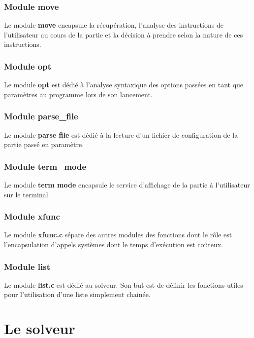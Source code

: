 \documentclass{report}
\begin{document}
\subsection*{Module move}
Le module \textbf{move} encapsule la récupération, l'analyse des instructions de l'utilisateur au cours de la partie et la décision à prendre selon la nature de ces instructions.
\subsection*{Module opt}
Le module \textbf{opt} est dédié à l'analyse syntaxique des options passées en tant que paramètres au programme lors de son lancement.
\subsection*{Module parse\_file}
Le module \textbf{parse file} est dédié à la lecture d'un fichier de configuration de la partie passé en paramètre.
\subsection*{Module term\_mode}
Le module \textbf{term mode} encapsule le service d'affichage de la partie à l'utilisateur sur le terminal.
\subsection*{Module xfunc}
Le module \textbf{xfunc.c} sépare des autres modules des fonctions dont le rôle est l'encapsulation d'appels systèmes dont le temps d'exécution est coûteux.
\subsection*{Module list}
Le module \textbf{list.c} est dédié au solveur. Son but est de définir les fonctions utiles pour l'utilisation d'une liste simplement chainée.


\chapter{Le solveur}
\setcounter{section}{0}
\end{document}
